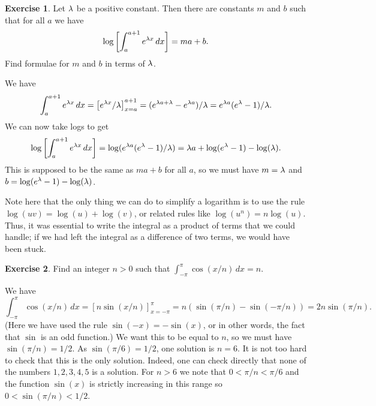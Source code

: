 \documentclass[a4paper]{amsart}
\theoremstyle{definition}
\newtheorem{exercise}{Exercise}[section]
\newenvironment{solution}{{\noindent \bf Solution:}}{}
\begin{document}
\begin{exercise}
 Let $\lambda$ be a positive constant.  Then there are constants $m$ and
 $b$ such that for all $a$ we have
 \[ \log\left[\int_a^{a+1} e^{\lambda x}\,dx\right] = ma+b. \]
 Find formulae for $m$ and $b$ in terms of $\lambda$.
\end{exercise}
\begin{solution}
 We have 
 \[ \int_a^{a+1} e^{\lambda x}\,dx = 
     \left[e^{\lambda x}/\lambda\right]_{x=a}^{a+1} = 
      (e^{\lambda a + \lambda}-e^{\lambda a})/\lambda = 
       e^{\lambda a} (e^\lambda -1)/\lambda.
 \]
 We can now take logs to get 
 \[ \log\left[\int_a^{a+1} e^{\lambda x}\,dx\right] =
     \log(e^{\lambda a}(e^\lambda -1)/\lambda) = 
      \lambda a + \log(e^\lambda-1)-\log(\lambda).
 \]
 This is supposed to be the same as $ma+b$ for all $a$, so we must
 have $m=\lambda$ and $b=\log(e^\lambda-1)-\log(\lambda)$.

 Note here that the only thing we can do to simplify a logarithm is to
 use the rule $\log(uv)=\log(u)+\log(v)$, or related rules like
 $\log(u^n)=n\log(u)$.  Thus, it was essential to write the integral
 as a product of terms that we could handle; if we had left the
 integral as a difference of two terms, we would have been stuck.
\end{solution}

\begin{exercise}
 Find an integer $n>0$ such that $\int_{-\pi}^\pi\cos(x/n)\,dx=n$.
\end{exercise}
\begin{solution}
 We have 
 \[ \int_{-\pi}^\pi\cos(x/n)\,dx = 
     \left[ n\sin(x/n) \right]_{x=-\pi}^\pi = 
      n(\sin(\pi/n)-\sin(-\pi/n)) = 2n\sin(\pi/n).
 \]
 (Here we have used the rule $\sin(-x)=-\sin(x)$, or in other words,
 the fact that $\sin$ is an odd function.)
 We want this to be equal to $n$, so we must have $\sin(\pi/n)=1/2$.
 As $\sin(\pi/6)=1/2$, one solution is $n=6$.  It is not too hard to
 check that this is the only solution.  Indeed, one can check directly
 that none of the numbers $1,2,3,4,5$ is a solution.  For $n>6$ we
 note that $0<\pi/n<\pi/6$ and the function $\sin(x)$ is strictly
 increasing in this range so $0<\sin(\pi/n)<1/2$.
\end{solution}
\end{document}
